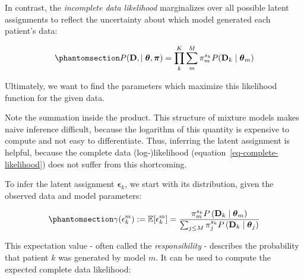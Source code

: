 \documentclass[
  sn-mathphys-num,
]{sn-jnl}
\begin{document}
\begin{tcolorbox}[enhanced jigsaw, breakable, colbacktitle=quarto-callout-note-color!10!white, left=2mm, colback=white, coltitle=black, arc=.35mm, bottomrule=.15mm, rightrule=.15mm, bottomtitle=1mm, opacitybacktitle=0.6, title=\textcolor{quarto-callout-note-color}{\faInfo}\hspace{0.5em}{TODO: Discuss if we need this}, titlerule=0mm, toptitle=1mm, toprule=.15mm, colframe=quarto-callout-note-color-frame, leftrule=.75mm, opacityback=0]

In contrast, the \emph{incomplete data likelihood} marginalizes over all
possible latent assignments to reflect the uncertainty about which model
generated each patient's data:

\begin{equation}\phantomsection\label{eq-incomplete-likelihood}{
P(\mathbf{D}, \mid \boldsymbol{\theta}, \boldsymbol{\pi}) = \prod_{k}^{K} \sum_{m}^{M} \pi_m^{s_k} P(\mathbf{D}_k \mid \boldsymbol{\theta}_m)
}\end{equation}

Ultimately, we want to find the parameters which maximize this
likelihood function for the given data.

Note the summation inside the product. This structure of mixture models
makes naive inference difficult, because the logarithm of this quantity
is expensive to compute and not easy to differentiate. Thus, inferring
the latent assignment is helpful, because the complete data
(log-)likelihood (equation~\ref{eq-complete-likelihood}) does not suffer
from this shortcoming.

\end{tcolorbox}

To infer the latent assignment \(\boldsymbol{\epsilon}_k\), we start
with its distribution, given the observed data and model parameters:

\begin{equation}\phantomsection\label{eq-responsibilities}{
\gamma(\epsilon_k^m) := \mathbb{E}[\epsilon_k^m] = \frac{\pi_m^{s_k} P \left( \mathbf{D}_k \mid \boldsymbol{\theta}_m \right)}{\sum_{j \leq M} \pi_j^{s_k} P \left( \mathbf{D}_k \mid \boldsymbol{\theta}_j \right)}
}\end{equation}

This expectation value - often called the \emph{responsibility} -
describes the probability that patient \(k\) was generated by model
\(m\). It can be used to compute the expected complete data likelihood:
\end{document}
